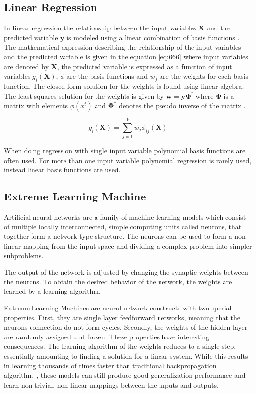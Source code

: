 \subsection{Linear Regression}
In linear regression the relationship between the input variables $\mathbf{X}$ and the predicted variable $\mathbf{y}$ is modeled using a linear combination of basis functions \cite{alpaydin:2004:introduction}. The mathematical expression describing the relationship of the input variables and the predicted variable is given in the equation \ref{eq:666} where input variables are denoted by $\mathbf{X}$, the predicted variable is expressed as a function of input variables $g_{i}(\mathbf{X})$, $\phi$ are the basis functions and $w_{j}$ are the weights for each basis function. The closed form solution for the weights is found using linear algebra. The least squares solution for the weights is given by $\mathbold{w = y\Phi^{\dagger}}$ where $\mathbold{\Phi}$ is a matrix with elements $\phi(x^{t})$ and $\mathbold{\Phi^{\dagger}}$ denotes the pseudo inverse of the matrix \cite{alpaydin:2004:introduction}.

\begin{equation}
    \label{eq:666}
    g_{i}(\mathbf{X}) = \sum^{k}_{j=1}{w_{j}\phi_{ij}(\mathbf{X})}
\end{equation}

When doing regression with single input variable polynomial basis functions are often used. For more than one input variable polynomial regression is rarely used, instead linear basis functions are used. \cite{alpaydin:2004:introduction}

\subsection{Extreme Learning Machine}
Artificial neural networks are a family of machine learning models which consist of multiple locally interconnected, simple computing units called neurons, that together form a network type structure. The neurons can be used to form a non-linear mapping from the input space and dividing a complex problem into simpler subproblems.~\cite{haykin:2009:neural-networks}

The output of the network is adjusted by changing the synaptic weights between the neurons. To obtain the desired behavior of the network, the  weights are learned by a learning algorithm.~\cite{haykin:2009:neural-networks}

Extreme Learning Machines are neural network constructs with two special properties. First, they are single layer feedforward networks, meaning that the neurons connection do not form cycles. Secondly, the weights of the hidden layer are randomly assigned and frozen. These properties have interesting consequences. The learning algorithm of the weights reduces to a single step, essentially amounting to finding a solution for a linear system. While this results in learning thousands of times faster than traditional backpropagation algorithm~\cite{haykin:2009:neural-networks}, these models can still produce good generalization performance and learn non-trivial, non-linear mappings between the inputs and outputs.~\cite{huang:2006:elm}

